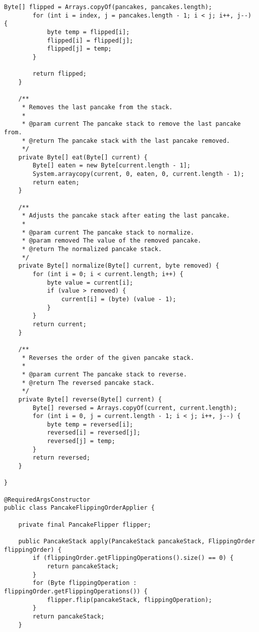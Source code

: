 \begin{lstlisting}[label={lst:source}]
        Byte[] flipped = Arrays.copyOf(pancakes, pancakes.length);
        for (int i = index, j = pancakes.length - 1; i < j; i++, j--) {
            byte temp = flipped[i];
            flipped[i] = flipped[j];
            flipped[j] = temp;
        }

        return flipped;
    }

    /**
     * Removes the last pancake from the stack.
     *
     * @param current The pancake stack to remove the last pancake from.
     * @return The pancake stack with the last pancake removed.
     */
    private Byte[] eat(Byte[] current) {
        Byte[] eaten = new Byte[current.length - 1];
        System.arraycopy(current, 0, eaten, 0, current.length - 1);
        return eaten;
    }

    /**
     * Adjusts the pancake stack after eating the last pancake.
     *
     * @param current The pancake stack to normalize.
     * @param removed The value of the removed pancake.
     * @return The normalized pancake stack.
     */
    private Byte[] normalize(Byte[] current, byte removed) {
        for (int i = 0; i < current.length; i++) {
            byte value = current[i];
            if (value > removed) {
                current[i] = (byte) (value - 1);
            }
        }
        return current;
    }

    /**
     * Reverses the order of the given pancake stack.
     *
     * @param current The pancake stack to reverse.
     * @return The reversed pancake stack.
     */
    private Byte[] reverse(Byte[] current) {
        Byte[] reversed = Arrays.copyOf(current, current.length);
        for (int i = 0, j = current.length - 1; i < j; i++, j--) {
            byte temp = reversed[i];
            reversed[i] = reversed[j];
            reversed[j] = temp;
        }
        return reversed;
    }

}

@RequiredArgsConstructor
public class PancakeFlippingOrderApplier {

    private final PancakeFlipper flipper;

    public PancakeStack apply(PancakeStack pancakeStack, FlippingOrder flippingOrder) {
        if (flippingOrder.getFlippingOperations().size() == 0) {
            return pancakeStack;
        }
        for (Byte flippingOperation : flippingOrder.getFlippingOperations()) {
            flipper.flip(pancakeStack, flippingOperation);
        }
        return pancakeStack;
    }


\end{lstlisting}
